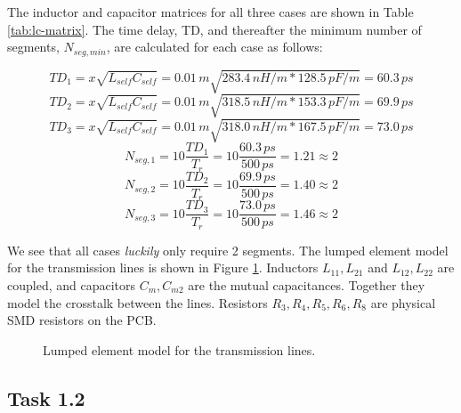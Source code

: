 \documentclass[../main.tex]{subfiles}
\begin{document}
The inductor and capacitor matrices for all three cases are shown in Table \ref{tab:lc-matrix}. The time delay, TD, and thereafter the minimum number of segments, $N_{seg, min}$, are calculated for each case as follows:

\begin{equation*}
    TD_1 = x \sqrt{L_{self} C_{self}} = 0.01\,\si{m} \sqrt{283.4\,\si{nH/m} * 128.5\,\si{pF/m}} = 60.3\,\si{ps}
\end{equation*}
\begin{equation*}
    TD_2 = x \sqrt{L_{self} C_{self}} = 0.01\,\si{m} \sqrt{318.5\,\si{nH/m} * 153.3\,\si{pF/m}} = 69.9\,\si{ps}
\end{equation*}
\begin{equation*}
    TD_3 = x \sqrt{L_{self} C_{self}} = 0.01\,\si{m} \sqrt{318.0\,\si{nH/m} * 167.5\,\si{pF/m}} = 73.0\,\si{ps}
\end{equation*}
\begin{equation*}
    N_{seg,1} = 10 \frac{TD_1}{T_r} = 10 \frac{60.3\,\si{ps}}{500\,\si{ps}} = 1.21 \approx 2
\end{equation*}
\begin{equation*}
    N_{seg,2} = 10 \frac{TD_2}{T_r} = 10 \frac{69.9\,\si{ps}}{500\,\si{ps}} = 1.40 \approx 2
\end{equation*}
\begin{equation*}
    N_{seg,3} = 10 \frac{TD_3}{T_r} = 10 \frac{73.0\,\si{ps}}{500\,\si{ps}} = 1.46 \approx 2
\end{equation*}

We see that all cases \textit{luckily} only require 2 segments. The lumped element model for the transmission lines is shown in Figure \ref{fig:transmission-line}. Inductors $L_{11}, L_{21}$ and $L_{12}, L_{22}$ are coupled, and capacitors $C_{m}, C_{m2}$ are the mutual capacitances. Together they model the crosstalk between the lines. Resistors $R_3, R_4, R_5, R_6, R_8$ are physical SMD resistors on the PCB.

\begin{figure}[h]
    \centering
    \caption{Lumped element model for the transmission lines.}
    \label{fig:transmission-line}
\end{figure}

\newpage

\subsection{Task 1.2}
\end{document}
